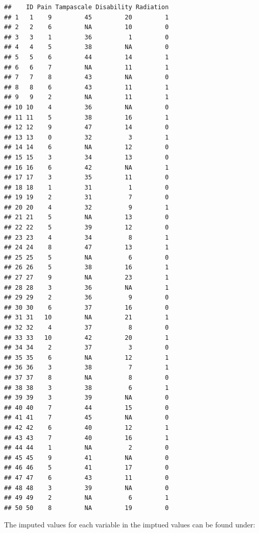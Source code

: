 \documentclass[]{book}
\theoremstyle{definition}
\theoremstyle{definition}
\theoremstyle{definition}
\theoremstyle{remark}
\begin{document}
\begin{verbatim}
##    ID Pain Tampascale Disability Radiation
## 1   1    9         45         20         1
## 2   2    6         NA         10         0
## 3   3    1         36          1         0
## 4   4    5         38         NA         0
## 5   5    6         44         14         1
## 6   6    7         NA         11         1
## 7   7    8         43         NA         0
## 8   8    6         43         11         1
## 9   9    2         NA         11         1
## 10 10    4         36         NA         0
## 11 11    5         38         16         1
## 12 12    9         47         14         0
## 13 13    0         32          3         1
## 14 14    6         NA         12         0
## 15 15    3         34         13         0
## 16 16    6         42         NA         1
## 17 17    3         35         11         0
## 18 18    1         31          1         0
## 19 19    2         31          7         0
## 20 20    4         32          9         1
## 21 21    5         NA         13         0
## 22 22    5         39         12         0
## 23 23    4         34          8         1
## 24 24    8         47         13         1
## 25 25    5         NA          6         0
## 26 26    5         38         16         1
## 27 27    9         NA         23         1
## 28 28    3         36         NA         1
## 29 29    2         36          9         0
## 30 30    6         37         16         0
## 31 31   10         NA         21         1
## 32 32    4         37          8         0
## 33 33   10         42         20         1
## 34 34    2         37          3         0
## 35 35    6         NA         12         1
## 36 36    3         38          7         1
## 37 37    8         NA          8         0
## 38 38    3         38          6         1
## 39 39    3         39         NA         0
## 40 40    7         44         15         0
## 41 41    7         45         NA         0
## 42 42    6         40         12         1
## 43 43    7         40         16         1
## 44 44    1         NA          2         0
## 45 45    9         41         NA         0
## 46 46    5         41         17         0
## 47 47    6         43         11         0
## 48 48    3         39         NA         0
## 49 49    2         NA          6         1
## 50 50    8         NA         19         0
\end{verbatim}

The imputed values for each variable in the imptued values can be found
under:
\end{document}
